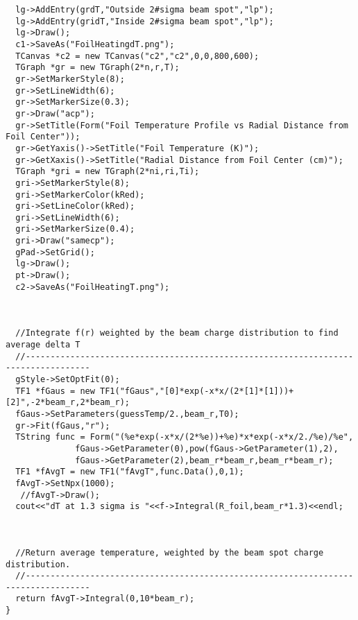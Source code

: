 \documentclass[12pt]{article}
\begin{document}
\begin{lstlisting}
  lg->AddEntry(grdT,"Outside 2#sigma beam spot","lp");
  lg->AddEntry(gridT,"Inside 2#sigma beam spot","lp");
  lg->Draw();
  c1->SaveAs("FoilHeatingdT.png");
  TCanvas *c2 = new TCanvas("c2","c2",0,0,800,600);
  TGraph *gr = new TGraph(2*n,r,T);
  gr->SetMarkerStyle(8);
  gr->SetLineWidth(6);
  gr->SetMarkerSize(0.3);
  gr->Draw("acp");
  gr->SetTitle(Form("Foil Temperature Profile vs Radial Distance from Foil Center"));
  gr->GetYaxis()->SetTitle("Foil Temperature (K)");
  gr->GetXaxis()->SetTitle("Radial Distance from Foil Center (cm)");
  TGraph *gri = new TGraph(2*ni,ri,Ti);
  gri->SetMarkerStyle(8);
  gri->SetMarkerColor(kRed);
  gri->SetLineColor(kRed);
  gri->SetLineWidth(6);
  gri->SetMarkerSize(0.4);
  gri->Draw("samecp");
  gPad->SetGrid();
  lg->Draw();
  pt->Draw();
  c2->SaveAs("FoilHeatingT.png");

  

  //Integrate f(r) weighted by the beam charge distribution to find average delta T 
  //-----------------------------------------------------------------------------------
  gStyle->SetOptFit(0);
  TF1 *fGaus = new TF1("fGaus","[0]*exp(-x*x/(2*[1]*[1]))+[2]",-2*beam_r,2*beam_r);
  fGaus->SetParameters(guessTemp/2.,beam_r,T0);
  gr->Fit(fGaus,"r");
  TString func = Form("(%e*exp(-x*x/(2*%e))+%e)*x*exp(-x*x/2./%e)/%e",
		      fGaus->GetParameter(0),pow(fGaus->GetParameter(1),2),
		      fGaus->GetParameter(2),beam_r*beam_r,beam_r*beam_r);
  TF1 *fAvgT = new TF1("fAvgT",func.Data(),0,1);
  fAvgT->SetNpx(1000);
   //fAvgT->Draw();
  cout<<"dT at 1.3 sigma is "<<f->Integral(R_foil,beam_r*1.3)<<endl;

  

  //Return average temperature, weighted by the beam spot charge distribution.
  //-----------------------------------------------------------------------------------
  return fAvgT->Integral(0,10*beam_r);
}
\end{lstlisting}
\end{document}
